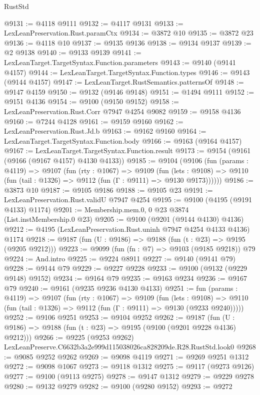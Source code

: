 \begin{lexlean}{RustStd}
\begin{coremodule}
@9131 := @4118 @9111
@9132 := @4117 @9131
@9133 := LexLeanPreservation.Rust.paramCtx
@9134 := @3872 @10
@9135 := @3872 @23
@9136 := @4118 @10
@9137 := @9135 @9136
@9138 := @9134 @9137
@9139 := @2 @9138
@9140 := @9133 @9139
@9141 := LexLeanTarget.TargetSyntax.Function.parameters
@9143 := @9140 (@9141 @4157)
@9144 := LexLeanTarget.TargetSyntax.Function.types
@9146 := @9143 (@9144 @4157)
@9147 := LexLeanTarget.RustSemantics.patternsOf
@9148 := @9147 @4159
@9150 := @9132 (@9146 @9148)
@9151 := @1494 @9111
@9152 := @9151 @4136
@9154 := @9100 (@9150 @9152)
@9158 := LexLeanPreservation.Rust.Corr @7947 @4254 @9082
@9159 := @9158 @4136
@9160 := @7244 @4128
@9161 := @9159 @9160
@9162 := LexLeanPreservation.Rust.Jd.b
@9163 := @9162 @9160
@9164 := LexLeanTarget.TargetSyntax.Function.body
@9166 := @9163 (@9164 @4157)
@9167 := LexLeanTarget.TargetSyntax.Function.result
@9173 := @9154 (@9161 (@9166 (@9167 @4157) @4130 @4133))
@9185 := @9104
    (@9106
      (fun (params : @4119) =>
      @9107
        (fun (rty : @1067) =>
        @9109
          (fun (lets : @9108) =>
          @9110 (fun (tail : @1326) => @9112 (fun (Γ : @9111) => @9130 @9173))))))
@9186 := @3873 @10
@9187 := @9105 @9186
@9188 := @9105 @23
@9191 := LexLeanPreservation.Rust.validU @7947 @4254
@9195 := @9100 (@4195 (@9191 @4133) @1174)
@9201 := Membership.mem.{0, 0} @23 @3874 (List.instMembership.{0} @23)
@9205 := @9100 (@9201 (@9144 @4130) @4136)
@9212 := @4195 (LexLeanPreservation.Rust.uninh @7947 @4254 @4133 @4136) @1174
@9218 := @9187 (fun (U : @9186) => @9188 (fun (t : @23) => @9195 (@9205 @9212)))
@9223 := @9099 (fun (fn : @7) => @9103 (@9185 @9218)) @79
@9224 := And.intro
@9225 := @9224 @8911
@9227 := @9140 (@9141 @79)
@9228 := @9144 @79
@9229 := @9227 @9228
@9233 := @9100 (@9132 (@9229 @9148) @9152)
@9234 := @9164 @79
@9235 := @9163 @9234
@9236 := @9167 @79
@9240 := @9161 (@9235 @9236 @4130 @4133)
@9251 := fun (params : @4119) =>
  @9107
    (fun (rty : @1067) =>
    @9109
      (fun (lets : @9108) =>
      @9110 (fun (tail : @1326) => @9112 (fun (Γ : @9111) => @9130 (@9233 @9240)))))
@9252 := @9106 @9251
@9253 := @9104 @9252
@9262 := @9187 (fun (U : @9186) => @9188 (fun (t : @23) => @9195 (@9100 (@9201 @9228 @4136) @9212)))
@9266 := @9225 (@9253 @9262) LexLeanPreserve.C6632b3a2e999d115038026ca828209de.R28.RustStd.look0
@9268 := @9085 @9252 @9262
@9269 := @9098 @4119
@9271 := @9269 @9251 @1312
@9272 := @9098 @1067
@9273 := @9118 @1312
@9275 := @9117 (@9273 @9126)
@9277 := @9100 (@9113 @9275)
@9278 := @9147 @1312
@9279 := @9229 @9278
@9280 := @9132 @9279
@9282 := @9100 (@9280 @9152)
@9293 := @9272

\end{coremodule}
\end{lexlean}

